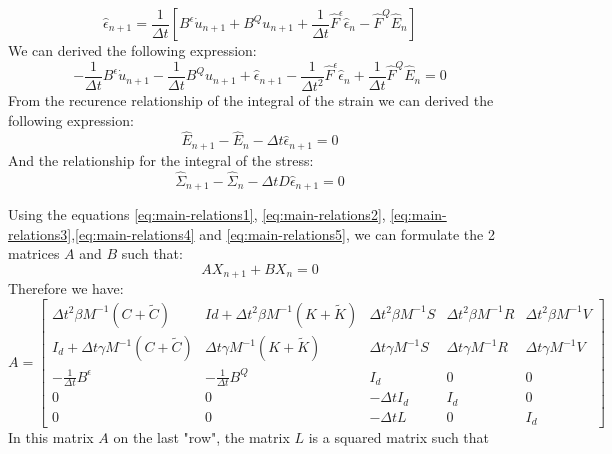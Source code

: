 \begin{equation}
\hat{\epsilon}_{n+1} = \frac{1}{\Delta t} \left[B^\epsilon \dot{u}_{n+1} + B^Q u_{n+1} + \frac{1}{\Delta t} \hat{F}^\epsilon \hat{\epsilon}_n-\hat{F}^Q \hat{E}_n \right]
\label{eq:stain-tn+1}
\end{equation}
We can derived the following expression:
\begin{equation}
- \frac{1}{\Delta t} B^\epsilon \dot{u}_{n+1} - \frac{1}{\Delta t} B^Q u_{n+1} + \hat{\epsilon}_{n+1}-\frac{1}{\Delta t^2} \hat{F}^\epsilon \hat{\epsilon}_n + \frac{1}{\Delta t} \hat{F}^Q \hat{E}_n = 0
\label{eq:main-relations3}
\end{equation} 
From the recurence relationship of the integral of the strain we can derived the following expression:
\begin{equation}
\hat{E}_{n+1} - \hat{E}_n - \Delta t \hat{\epsilon}_{n+1} = 0
\label{eq:main-relations4}
\end{equation} 
And the relationship for the integral of the stress:
\begin{equation}
\hat{\Sigma}_{n+1} - \hat{\Sigma}_n - \Delta t D \hat{\epsilon}_{n+1} = 0
\label{eq:main-relations5}
\end{equation} 
\par Using the equations \ref{eq:main-relations1}, \ref{eq:main-relations2}, \ref{eq:main-relations3},\ref{eq:main-relations4} and \ref{eq:main-relations5}, we can formulate the 2 matrices $A$ and $B$ such that:
\begin{equation}
A X_{n+1} + B X_n = 0
\label{eq:geradin-ampl}
\end{equation} 
Therefore we have:
\begin{equation}
A = \begin{bmatrix}
\Delta t^2 \beta M^{-1} (C+\tilde{C}) & Id + \Delta t^2 \beta M^{-1}(K+\tilde{K}) & \Delta t^2 \beta M^{-1} S & \Delta t^2 \beta M^{-1} R & \Delta t^2 \beta M^{-1} V \\
I_d + \Delta t \gamma M^{-1} (C+\tilde{C})& \Delta t \gamma M^{-1} (K+\tilde{K}) & \Delta t \gamma M^{-1} S& \Delta t \gamma M^{-1} R & \Delta t \gamma M^{-1} V \\
-\frac{1}{\Delta t} B^\epsilon & -\frac{1}{\Delta t} B^Q & I_d & 0 & 0 \\
0 & 0 & -\Delta t I_d & I_d & 0 \\
0 & 0 & -\Delta t L & 0 & I_d 
\end{bmatrix}
\label{eq:A}
\end{equation}
In this matrix $A$ on the last "row", the matrix $L$ is a squared matrix such that   
